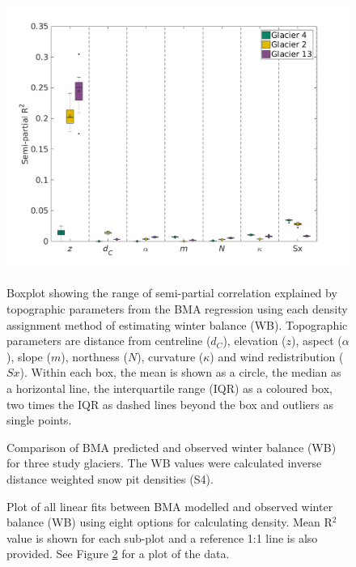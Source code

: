\documentclass{sfuthesis}
\newcommand{\params}{Topographic parameters are distance from centreline ($d_C$), elevation ($z$), aspect ($\alpha$), slope ($m$), northness ($N$), curvature ($\kappa$) and wind redistribution ($Sx$). }
\newcommand{\boxplot}{Within each box, the mean is shown as a circle, the median as a horizontal line, the interquartile range (IQR) as a coloured box, two times the IQR as dashed lines beyond the box and outliers as single points. }
\begin{document}
\begin{figure}[H]
	\centering
	\includegraphics[width =1.1 \textwidth]{BMSsemiR2_DensityOpts.png}\\
	\caption{Boxplot showing the range of semi-partial correlation explained by topographic parameters from the BMA regression using each density assignment method of estimating winter balance (WB). \params \boxplot }
	\label{fig:BMAsemiR2_densityOptions}
\end{figure} 
 
\begin{figure}[H]
	\caption{Comparison of BMA predicted and observed winter balance (WB) for three study glaciers. The WB values were calculated inverse distance weighted snow pit densities (S4).}
	\label{fig:BMSfit_opt8}
\end{figure}

\begin{figure}[H]
	\caption{Plot of all linear fits between BMA modelled and observed winter balance (WB) using eight options for calculating density. Mean R$^2$ value is shown for each sub-plot and a reference 1:1 line is also provided. See Figure \ref{fig:BMSfit_opt8} for a plot of the data. }
	\label{fig:BMSfit_allLines}
\end{figure}
\end{document}
